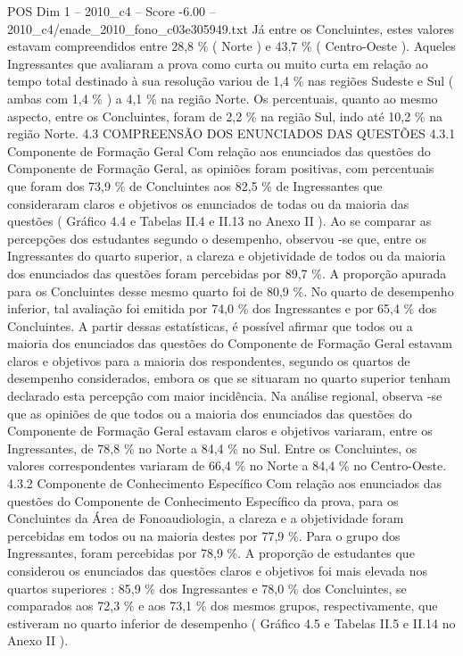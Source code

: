 \begin{textsample}{POS Dim 1 – 2010\_c4 – Score -6.00 – 2010\_c4/enade\_2010\_fono\_c03e305949.txt}
Já entre os Concluintes, estes valores estavam compreendidos entre 28,8 \% ( Norte ) e 43,7 \% ( Centro-Oeste ).
Aqueles Ingressantes que avaliaram a prova como curta ou muito curta em relação ao tempo total destinado à sua resolução variou de 1,4 \% nas regiões Sudeste e Sul ( ambas com 1,4 \% ) a 4,1 \% na região Norte.
Os percentuais, quanto ao mesmo aspecto, entre os Concluintes, foram de 2,2 \% na região Sul, indo até 10,2 \% na região Norte. 4.3 COMPREENSÃO DOS ENUNCIADOS DAS QUESTÕES 4.3.1 Componente de Formação Geral Com relação aos enunciados das questões do Componente de Formação Geral, as opiniões foram positivas, com percentuais que foram dos 73,9 \% de Concluintes aos 82,5 \% de Ingressantes que consideraram claros e objetivos os enunciados de todas ou da maioria das questões ( Gráfico 4.4 e Tabelas II.4 e II.13 no Anexo II ).
Ao se comparar as percepções dos estudantes segundo o desempenho, observou -se que, entre os Ingressantes do quarto superior, a clareza e objetividade de todos ou da maioria dos enunciados das questões foram percebidas por 89,7 \%.
A proporção apurada para os Concluintes desse mesmo quarto foi de 80,9 \%.
No quarto de desempenho inferior, tal avaliação foi emitida por 74,0 \% dos Ingressantes e por 65,4 \% dos Concluintes.
A partir dessas estatísticas, é possível afirmar que todos ou a maioria dos enunciados das questões do Componente de Formação Geral estavam claros e objetivos para a maioria dos respondentes, segundo os quartos de desempenho considerados, embora os que se situaram no quarto superior tenham declarado esta percepção com maior incidência.
Na análise regional, observa -se que as opiniões de que todos ou a maioria dos enunciados das questões do Componente de Formação Geral estavam claros e objetivos variaram, entre os Ingressantes, de 78,8 \% no Norte a 84,4 \% no Sul.
Entre os Concluintes, os valores correspondentes variaram de 66,4 \% no Norte a 84,4 \% no Centro-Oeste. 4.3.2 Componente de Conhecimento Específico Com relação aos enunciados das questões do Componente de Conhecimento Específico da prova, para os Concluintes da Área de Fonoaudiologia, a clareza e a objetividade foram percebidas em todos ou na maioria destes por 77,9 \%.
Para o grupo dos Ingressantes, foram percebidas por 78,9 \%.
A proporção de estudantes que considerou os enunciados das questões claros e objetivos foi mais elevada nos quartos superiores : 85,9 \% dos Ingressantes e 78,0 \% dos Concluintes, se comparados aos 72,3 \% e aos 73,1 \% dos mesmos grupos, respectivamente, que estiveram no quarto inferior de desempenho ( Gráfico 4.5 e Tabelas II.5 e II.14 no Anexo II ).

\end{textsample}
